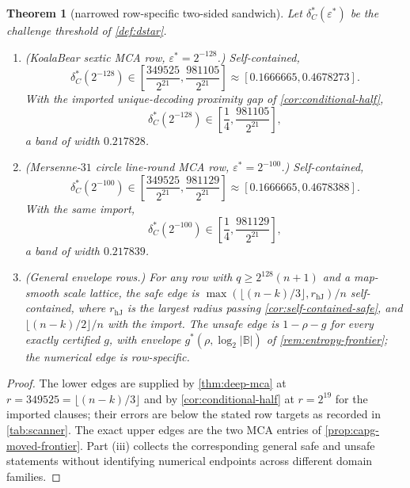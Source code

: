 \documentclass[11pt]{article}
\newtheorem{theorem}{Theorem}[section]
\theoremstyle{definition}
\theoremstyle{remark}
\newcommand{\B}{\mathbb{B}}
\begin{document}
\begin{theorem}[narrowed row-specific two-sided sandwich]\label{thm:sandwich2}
Let $\delta^*_C(\varepsilon^*)$ be the challenge threshold of \cref{def:dstar}.
\begin{enumerate}[label=\textup{(\roman*)}]
\item \textup{(KoalaBear sextic MCA row, $\varepsilon^*=2^{-128}$.)} Self-contained,
\[
\delta^*_C(2^{-128})\in
\left[\frac{349525}{2^{21}},\frac{981105}{2^{21}}\right]
\approx[0.1666665,0.4678273].
\]
With the imported unique-decoding proximity gap of \cref{cor:conditional-half},
\[
\delta^*_C(2^{-128})\in
\left[\frac14,\frac{981105}{2^{21}}\right],
\]
a band of width $0.217828$.
\item \textup{(Mersenne-$31$ circle line-round MCA row, $\varepsilon^*=2^{-100}$.)} Self-contained,
\[
\delta^*_C(2^{-100})\in
\left[\frac{349525}{2^{21}},\frac{981129}{2^{21}}\right]
\approx[0.1666665,0.4678388].
\]
With the same import,
\[
\delta^*_C(2^{-100})\in
\left[\frac14,\frac{981129}{2^{21}}\right],
\]
a band of width $0.217839$.
\item \textup{(General envelope rows.)} For any row with $q\ge2^{128}(n+1)$ and a map-smooth scale lattice, the safe edge is $\max(\lfloor(n-k)/3\rfloor,r_{\mathrm{hJ}})/n$ self-contained, where $r_{\mathrm{hJ}}$ is the largest radius passing \cref{cor:self-contained-safe}, and $\lfloor(n-k)/2\rfloor/n$ with the import.  The unsafe edge is $1-\rho-g$ for every exactly certified $g$, with envelope $g^*(\rho,\log_2|\B|)$ of \cref{rem:entropy-frontier}; the numerical edge is row-specific.
\end{enumerate}
\end{theorem}

\begin{proof}
The lower edges are supplied by \cref{thm:deep-mca} at $r=349525=\lfloor(n-k)/3\rfloor$ and by \cref{cor:conditional-half} at $r=2^{19}$ for the imported clauses; their errors are below the stated row targets as recorded in \cref{tab:scanner}.  The exact upper edges are the two MCA entries of \cref{prop:capg-moved-frontier}.  Part \textup{(iii)} collects the corresponding general safe and unsafe statements without identifying numerical endpoints across different domain families.
\end{proof}
\end{document}
